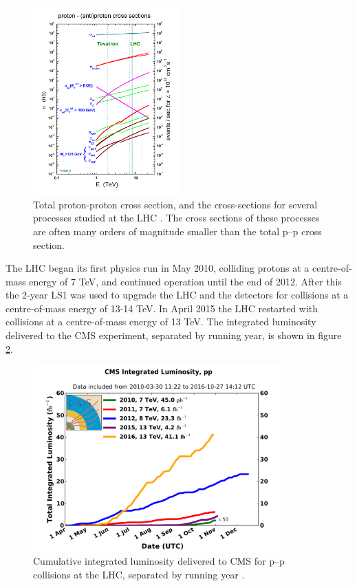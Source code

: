 \begin{figure}[h!]
\includegraphics[width=0.5\textwidth]{./Detector/Plots/crosssections2013.jpg}
\caption[Total proton-proton cross section, and the cross-sections for
several processes studied at the LHC.]{Total proton-proton cross section, and the cross-sections
for several processes studied at the LHC \cite{stirling-crosssection}.
The cross sections of these processes
are often many orders of magnitude smaller than the total p--p cross section.}
\label{fig:stirling_xs}
\end{figure}


The \ac{LHC} began its first physics run in May 2010, colliding protons at
a centre-of-mass energy of 7 TeV, and continued operation until the end of 2012. After this the 
2-year \ac{LS1} was used to upgrade the \ac{LHC} and the detectors for collisions at a centre-of-mass
energy of 13-14 TeV. In April 2015 the \ac{LHC} restarted with collisions at a centre-of-mass energy of
13 TeV. The integrated luminosity delivered to the \ac{CMS} experiment, separated by running year, is shown in
figure \ref{fig:CMSLHC_intlumi}.

\begin{figure}[h!]
\includegraphics[width=0.85\textwidth]{./Detector/Plots/int_lumi_cumulative_pp_2.pdf}
\caption[Cumulative integrated luminosity delivered to CMS
for p--p collisions at the LHC, separated by running year.]{Cumulative integrated luminosity delivered to \ac{CMS} for p--p collisions at the \ac{LHC}, separated
by running year \cite{cms-lumi-public}.}
\label{fig:CMSLHC_intlumi}
\end{figure}

